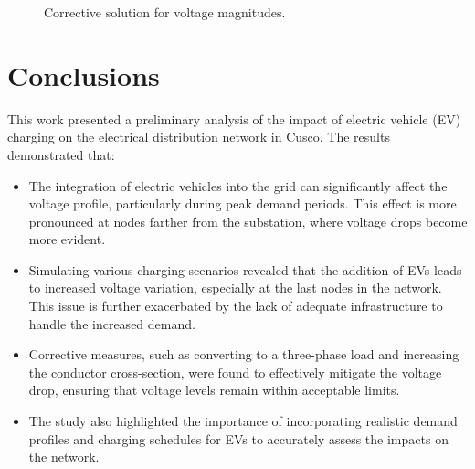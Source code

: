 \documentclass[12pt, 3p]{elsarticle}
\begin{document}
\begin{figure}[!ht]
    \centering
    \caption{Corrective solution for voltage magnitudes.}
    \label{fig:case_III_base}
\end{figure}


\section{Conclusions}\label{sec:conclusions}
    

This work presented a preliminary analysis of the impact of 
electric vehicle (EV) charging on the electrical distribution 
network in Cusco. The results demonstrated that:

\begin{itemize}
    \item The integration of electric vehicles into the grid can significantly affect the voltage profile, particularly during peak demand periods. This effect is more pronounced at nodes farther from the substation, where voltage drops become more evident.
    \item Simulating various charging scenarios revealed that the addition of EVs leads to increased voltage variation, especially at the last nodes in the network. This issue is further exacerbated by the lack of adequate infrastructure to handle the increased demand.
    \item Corrective measures, such as converting to a three-phase load and increasing the conductor cross-section, were found to effectively mitigate the voltage drop, ensuring that voltage levels remain within acceptable limits.
    \item The study also highlighted the importance of incorporating realistic demand profiles and charging schedules for EVs to accurately assess the impacts on the network.
\end{itemize}
\end{document}
